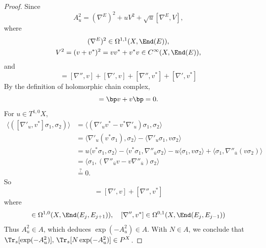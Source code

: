 \begin{proof}
    Since 
    \begin{equation*}
    A_u^2=(\nabla^E)^2+uV^2+\sqrt{u}[\nabla^E,V],
    \end{equation*}
    where
    \begin{gather*}
        (\nabla^E)^2\in\Omega^{1,1}(X,\End(E)), \\
        V^2=(v+v^*)^2=vv^*+v^*v\in C^\infty(X,\End(E)), \\
    \end{gather*}
    and
    \begin{equation*}
        [\nabla^E,V]=[\nabla'',v] + [\nabla',v] + 
        [\nabla'',v^*] + [\nabla',v^*]
    \end{equation*}
    By the definition of holomorphic chain complex, 
    \begin{equation*}
        [\nabla'',v] = \bp v + v\bp = 0.
    \end{equation*}
    For $u\in T^{1,0}X$, 
    \begin{align*}
        \langle([\nabla'_u,v^*]\sigma_1,\sigma_2)\rangle &= 
        \langle(\nabla'_u v^*-v^* \nabla'_u)\sigma_1,\sigma_2\rangle \\
        &=\langle\nabla'_u(v^*\sigma_1),\sigma_2\rangle 
        -\langle\nabla'_u\sigma_1,v\sigma_2\rangle \\
        &=u\langle v^*\sigma_1,\sigma_2\rangle 
        -\langle v^*\sigma_1,\nabla''_{\bar{u}}\sigma_2\rangle 
        -u\langle\sigma_1,v\sigma_2\rangle 
        +\langle\sigma_1,\nabla''_{\bar{u}}(v\sigma_2)\rangle \\
        &=\langle\sigma_1,
        (\nabla''_{\bar{u}}v-v\nabla''_{\bar{u}})\sigma_2\rangle \\
        &\overset{?}{=}0.
    \end{align*}
    So 
    \begin{equation*}
        [\nabla^E,V]=[\nabla',v] + [\nabla'',v^*]
    \end{equation*}
    where
    \begin{equation*}
        [\nabla',v]\in \Omega^{1,0}(X,\End(E_j,E_{j+1})),\quad 
        [\nabla'',v^*]\in \Omega^{0,1}(X,\End(E_j,E_{j-1}))
    \end{equation*}
    Thus $A_u^2\in A$, which deduces $\exp(-A_u^2)\in A$. With $N\in A$, 
    we conclude that $\Tr_s[\exp(-A_u^2)],\,\Tr_s[N\exp(-A_u^2)]\in P^X$.


\end{proof}
